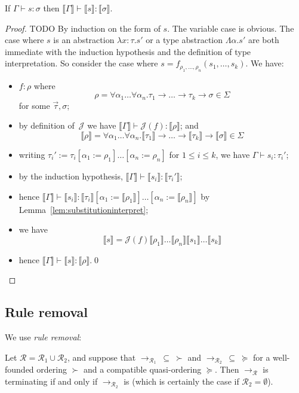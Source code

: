 \documentclass[runningheads,a4paper]{llncs}
\newcommand{\Rules}{\mathcal{R}}
\newcommand{\Termmap}{\mathcal{J}}
\newcommand{\typeinterpret}[1]{\llbracket #1 \rrbracket}
\newcommand{\interpret}[1]{\llbracket #1 \rrbracket}
\newcommand{\itp}[1]{\llbracket #1 \rrbracket}
\newcommand{\arr}[1]{\longrightarrow_{#1}}
\newcommand{\arrtype}{\rightarrow}
\newcommand{\abs}[2]{\lambda #1.#2}
\newcommand{\tabs}[2]{\Lambda #1.#2}
\begin{document}
\begin{lemma}
If $\Gamma \vdash s : \sigma$ then $\itp{\Gamma} \vdash \interpret{s}
: \typeinterpret{\sigma}$.
\end{lemma}

\begin{proof} TODO
By induction on the form of $s$.  The variable case is obvious. The
case where $s$ is an abstraction $\abs{x:\tau}{s'}$ or a type
abstraction $\tabs{\alpha}{s'}$ are both immediate with the induction
hypothesis and the definition of type interpretation.  So consider the
case where $s = f_{\rho_1,\dots,\rho_n}(s_1,\dots,s_k)$. We have:
\begin{itemize}
\item $f : \rho$ where
  \[
  \rho = \forall \alpha_1 \ldots \forall \alpha_n . \tau_1 \arrtype
  \dots \arrtype \tau_k \arrtype \sigma \in \Sigma
  \]
  for some $\vec{\tau},\sigma$;
\item by definition of~$\Termmap$ we have $\itp{\Gamma} \vdash
  \Termmap(f) : \typeinterpret{\rho}$; and
  \[
  \typeinterpret{\rho} = \forall \alpha_1 \ldots \forall \alpha_n
  . \typeinterpret{\tau_1} \arrtype \dots \arrtype
  \typeinterpret{\tau_k} \arrtype \typeinterpret{\sigma} \in \Sigma
  \]
\item writing $\tau_i' := \tau_i[\alpha_1:=\rho_1]\dots[\alpha_n:=
  \rho_n]$ for $1 \leq i \leq k$, we have $\Gamma \vdash s_i :
  \tau_i'$;
\item by the induction hypothesis, $\itp{\Gamma} \vdash
  \interpret{s_i} : \typeinterpret{\tau_i'}$;
\item hence $\itp{\Gamma} \vdash \interpret{s_i} :
  \typeinterpret{\tau_i}[\alpha_1:=\typeinterpret{\rho_1}]\ldots[\alpha_n:=\typeinterpret{\rho_n}]$
  by Lemma~\ref{lem:substitutioninterpret};
\item we have
  \[
  \interpret{s} = \Termmap(f) \typeinterpret{\rho_1} \ldots
  \typeinterpret{\rho_n} \interpret{s_1} \ldots \interpret{s_k}
  \]
\item hence $\itp{\Gamma} \vdash \interpret{s} :
  \typeinterpret{\rho}$.\qed
\end{itemize}
\end{proof}

\subsection{Rule removal}

We use \emph{rule removal}:

\begin{theorem}\label{thm:ruleremove}
Let $\Rules = \Rules_1 \cup \Rules_2$, and suppose that $\arr{\Rules_1}\:
\subseteq\:\succ$ and $\arr{\Rules_2}\:\subseteq\:\succeq$ for a
well-founded ordering $\succ$ and a compatible quasi-ordering $\succeq$.
Then $\arr{\Rules}$ is terminating if and only if $\arr{\Rules_2}$ is
(which is certainly the case if $\Rules_2 = \emptyset$).
\end{theorem}
\end{document}
